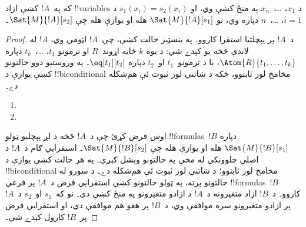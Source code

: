 \documentclass[../../../include/open-logic-section]{subfiles}
\begin{document}
\begin{prop}
که په~$!A$ کښې ازاد !!{variable}s د $x_1$، \dots،~$x_n$ په منځ کښې
وي، او $s_1(x_i) = s_2(x_i)$ د $i = 1$، \dots،~$n$ دپاره وي، نو
$\Sat{M}{!A}[s_1]$ هله او يوازې هله چې $\Sat{M}{!A}[s_2]$۔
\end{prop}

\begin{proof}
د~$!A$ پر پېچلتيا استقرا کاروو۔ په بنسټيز حالت کښې، چې~$!A$ اټومي
وي، $!A$ له لاندې څخه يو کېدے شي:
د يوه $k$-ځايه اړوند~$R$ او ترمونو $t_1$، \dots،~$t_k$ دپاره
$\Atom{R}{t_1, \dots, t_k}$، يا د ترمونو~$t_1$ او~$t_2$ دپاره
$\eq[t_1][t_2]$۔ په وروستيو دوو حالتونو کښې يوازې د
!!{biconditional} مخامخ لور ثابتوو، ځکه د شاتني لور ثبوت ئې هم‌شکله
دے۔

\begin{enumerate}


\item
\item
\end{enumerate}

اوس فرض کړئ چې د~$!A$ څخه د لږ پېچليو ټولو !!{formula}s~$!B$ دپاره
$\Sat{M}{!B}[s_1]$ هله او يوازې هله چې $\Sat{M}{!B}[s_2]$۔ استقرايي
ګام د~$!A$ د اصلي چلوونکي له مخې په حالتونو وېشل کېږي۔ په هر
حالت کښې يوازې د !!{biconditional} مخامخ لور ثابتوو؛ د شاتني لور
ثبوت ئې هم‌شکله دے۔ د سورو له حالتونو پرته، په ټولو حالتونو کښې
استقرايي فرض د~$!A$ پر فرعي !!{formula}s~$!B$ کاروو۔ د~$!B$ ازاد
متغيرونه د~$!A$ د ازادو متغيرونو په منځ کښې دي۔ نو که~$s_1$ او~$s_2$
د~$!A$ پر ازادو متغيرونو سره موافقې وي، د~$!B$ پر هغو هم موافقې دي،
او استقرايي فرض پر~$!B$ کارول کېدے شي۔


\end{proof}
\end{document}
